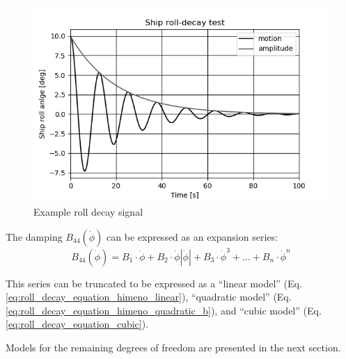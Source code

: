 \begin{figure}[H]
    \centering
    \includegraphics[width=\linewidth]{kappa/images/roll-decay.png}
    \caption{Example roll decay signal}
    \label{fig:rolldecay}
\end{figure}

\noindent The damping $B_{44}\left(\dot{\phi}\right)$ can be expressed as an expansion series:  
\begin{equation}
    B_{44}\left(\dot{\phi}\right) = B_1\cdot\dot{\phi} + B_2\cdot\dot{\phi}\left|\dot{\phi}\right| + B_3\cdot\dot{\phi}^3 + ... + B_n\cdot\dot{\phi}^n
\end{equation}
 
\noindent This series can be truncated to be expressed as a ``linear model'' (Eq.\ref{eq:roll_decay_equation_himeno_linear}), ``quadratic model'' (Eq.\ref{eq:roll_decay_equation_himeno_quadratic_b}), and ``cubic model'' (Eq.\ref{eq:roll_decay_equation_cubic}).




Models for the remaining degrees of freedom are presented in the next section.


